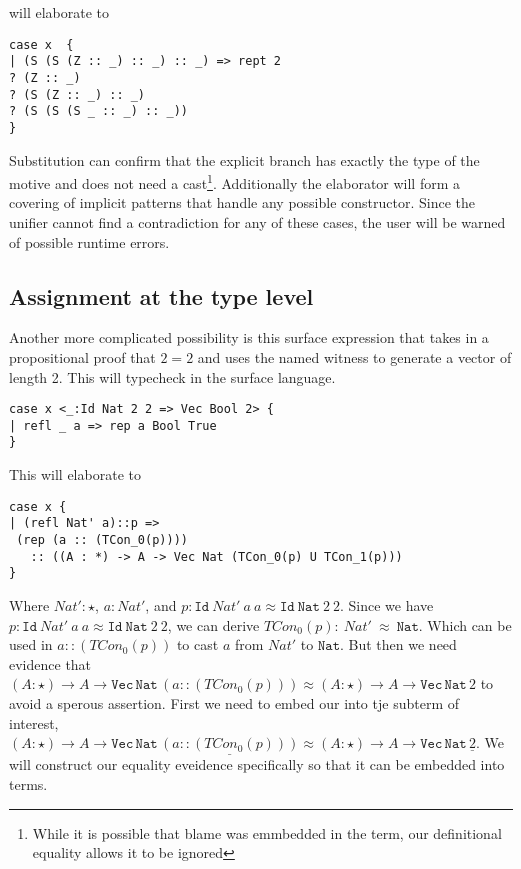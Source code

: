 will elaborate to
\begin{lstlisting}[basicstyle={\ttfamily\small}]
case x  {
| (S (S (Z :: _) :: _) :: _) => rept 2
? (Z :: _)
? (S (Z :: _) :: _)
? (S (S (S _ :: _) :: _))
}
\end{lstlisting}
 
Substitution can confirm that the explicit branch has exactly the type of the motive and does not need a cast\footnote{
  While it is possible that blame was emmbedded in the term, our definitional equality allows it to be ignored}.
Additionally the elaborator will form a covering of implicit patterns that handle any possible constructor.
Since the unifier cannot find a contradiction for any of these cases, the user will be warned of possible runtime errors.
 
\subsection{Assignment at the type level}
 
Another more complicated possibility is this surface expression that takes in a propositional proof that $2=2$ and uses the named witness to generate a vector of length 2.
This will typecheck in the surface language.
 
\begin{lstlisting}[basicstyle={\ttfamily\small}]
case x <_:Id Nat 2 2 => Vec Bool 2> {
| refl _ a => rep a Bool True
}
\end{lstlisting}
 
This will elaborate to
 
\begin{lstlisting}[basicstyle={\ttfamily\small}]
case x {
| (refl Nat' a)::p =>
 (rep (a :: (TCon_0(p)))) 
   :: ((A : *) -> A -> Vec Nat (TCon_0(p) U TCon_1(p)))
}
\end{lstlisting}
 
Where $Nat':\star$, $a:Nat'$, and $p:\mathtt{Id}\ Nat'\ a\ a\approx\mathtt{Id}\ \mathtt{Nat}\ 2\ 2$.
Since we have $p:\mathtt{Id}\ Nat'\ a\ a\approx\mathtt{Id}\ \mathtt{Nat}\ 2\ 2$, we can derive $TCon_0(p):\ Nat'\ \approx\ \mathtt{Nat}$.
Which can be used in $a::(TCon_0(p))$ to cast $a$ from $Nat'$ to $\mathtt{Nat}$.
But then we need evidence that $(A:\star)\rightarrow A\rightarrow\mathtt{Vec}\,\mathtt{Nat}\,(a :: (TCon_0(p)))\approx(A:\star)\rightarrow A\rightarrow\mathtt{Vec}\,\mathtt{Nat}\,2$ to avoid a sperous assertion.
First we need to embed our into tje subterm of interest, $(A:\star)\rightarrow A\rightarrow\mathtt{Vec}\,\mathtt{Nat}\,\underline{(a :: (TCon_0(p)))}\approx(A:\star)\rightarrow A\rightarrow\mathtt{Vec}\,\mathtt{Nat}\,\underline{2}$.
We will construct our equality eveidence specifically so that it can be embedded into terms.
 
